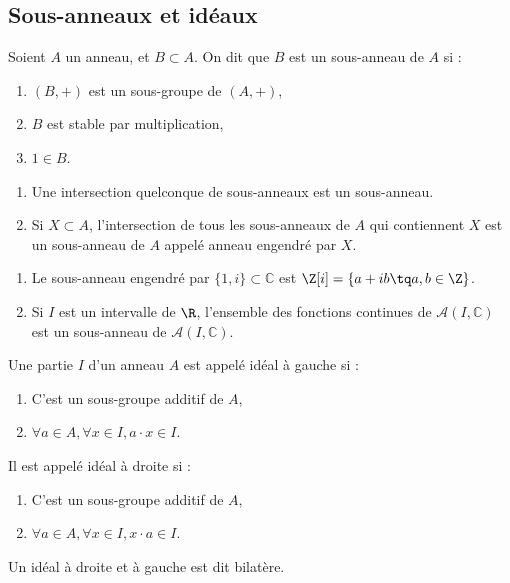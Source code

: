 \subsection{Sous-anneaux et idéaux}
\vspace{0.5em}

\begin{defi}

 Soient $A$ un anneau, et $B \subset A$. On dit que $B$ est un sous-anneau de
$A$ si :
\begin{enumerate}
 \item $(B,+)$ est un sous-groupe de $(A,+)$,
 \item $B$ est stable par multiplication,
 \item $1 \in B$.
\end{enumerate}
\end{defi}
 
\begin{defiprop}
 \begin{enumerate}
  \item Une intersection quelconque de sous-anneaux est un sous-anneau.
  \item Si $X \subset A$, l'intersection de tous les sous-anneaux de $A$ qui
contiennent $X$ est un sous-anneau de $A$ appelé anneau engendré par $X$.
 \end{enumerate}
\end{defiprop}

\begin{example}[Exemples]
\begin{enumerate}            
 \item Le sous-anneau engendré par $\{1,i\} \subset \mathbb{C}$ est $\Z[i] = \{a
+ ib \tq a,b \in \Z \}$.
\item Si $I$ est un intervalle de $\R$, l'ensemble
des fonctions continues de $\mathcal{A}(I,\mathbb{C})$ est un sous-anneau de
$\mathcal{A}(I,\mathbb{C})$.
\end{enumerate}
\end{example}

\begin{defi}[Idéal]
 Une partie $I$ d'un anneau $A$ est appelé idéal à gauche si :
\begin{enumerate}
 \item C'est un sous-groupe additif de $A$,
 \item $\forall a \in A, \forall x \in I, a\cdotp x \in I$.
\end{enumerate}
Il est appelé idéal à droite si :
\begin{enumerate}
 \item C'est un sous-groupe additif de $A$,
 \item $\forall a \in A, \forall x \in I, x\cdotp a \in I$.
\end{enumerate}
Un idéal à droite et à gauche est dit bilatère.
\end{defi}

